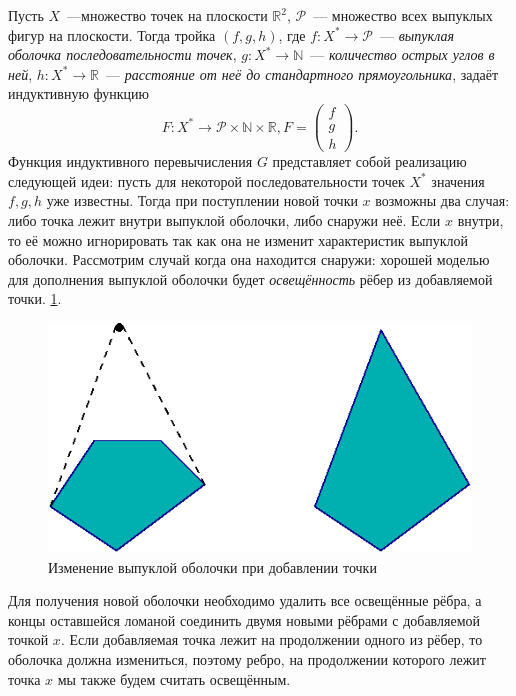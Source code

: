 Пусть $X$~---множество точек на плоскости $\mathbb{R}^2$, $\mathcal{P}$~---
множество всех выпуклых фигур на плоскости. Тогда тройка $(f,g,h)$, где
$f\colon X^* \rightarrow \mathcal{P}$~---
\emph{выпуклая оболочка последовательности точек},
$g\colon X^* \rightarrow \mathbb{N}$~--- \emph{количество острых углов в ней},
$h\colon X^* \rightarrow \mathbb{R}$~---
\emph{расстояние от неё до стандартного прямоугольника}, задаёт индуктивную
функцию $$F\colon X^* \rightarrow \mathcal{P} \times \mathbb{N} \times
\mathbb{R}, F = \begin{pmatrix}f\\ g\\ h\end{pmatrix}.$$
Функция индуктивного перевычисления $G$ представляет собой реализацию следующей
идеи: пусть для некоторой последовательности точек $X^*$ значения $f,g,h$ уже известны.
Тогда при поступлении новой точки $x$ возможны два случая:
либо точка лежит внутри выпуклой оболочки, либо снаружи неё. Если $x$ внутри,
то её можно игнорировать так как она не изменит характеристик выпуклой оболочки.
Рассмотрим случай когда она находится снаружи: хорошей
моделью для дополнения выпуклой оболочки будет \emph{освещённость} рёбер из
добавляемой точки.
 \ref{fig:conv_light}.
\begin{figure}[ht!]
\begin{center}
\includegraphics[scale=0.6]{images/conv_a_2}
\end{center}
\vspace*{-8mm}
\caption{Изменение выпуклой оболочки при добавлении точки}\label{fig:conv_light}
\end{figure}

Для получения новой оболочки необходимо удалить все освещённые рёбра, а концы
оставшейся ломаной соединить двумя новыми рёбрами с добавляемой точкой $x$.
Если добавляемая точка лежит на продолжении одного из рёбер, то оболочка должна
измениться, поэтому ребро, на продолжении которого лежит точка $x$ мы также будем
считать освещённым.
\newpage
